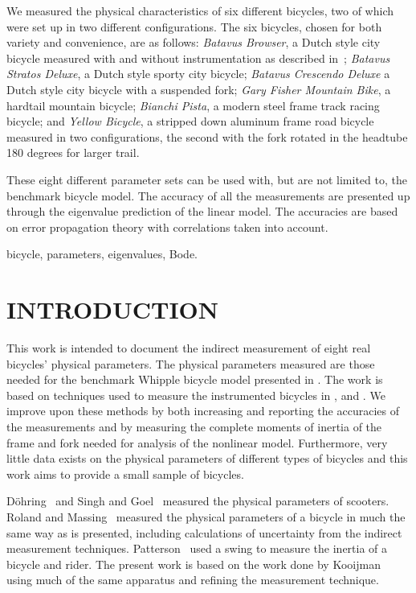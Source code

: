 \documentclass{bmd2010p}
\begin{document}
We measured the physical characteristics of six different bicycles, two of
which were set up in two different configurations. The six bicycles, chosen for
both variety and convenience, are as follows:
\emph{Batavus Browser}, a Dutch style city bicycle measured with and without
instrumentation as described in~\cite{Kooijman2009a}; \emph{Batavus Stratos
Deluxe}, a Dutch style sporty city bicycle; \emph{Batavus Crescendo Deluxe} a
Dutch style city bicycle with a suspended fork; \emph{Gary Fisher Mountain
Bike}, a hardtail mountain bicycle; \emph{Bianchi Pista}, a modern steel frame
track racing bicycle; and \emph{Yellow Bicycle}, a stripped down aluminum frame
road bicycle measured in two configurations, the second with the fork rotated
in the headtube 180 degrees for larger trail.

These eight different parameter sets can be used with, but are not
limited to, the benchmark bicycle model. The accuracy of all the measurements
are presented up through the eigenvalue prediction of the linear model. The
accuracies are based on error propagation theory with correlations taken into
account.

\begin{keywords}
bicycle,
parameters,
eigenvalues,
Bode.
\end{keywords}

\section{INTRODUCTION}
This work is intended to document the indirect measurement of eight real
bicycles' physical parameters. The physical parameters measured are those
needed for the benchmark Whipple bicycle model presented in
\cite{Meijaard2007}. The work is based on techniques used to measure the
instrumented bicycles in \cite{Kooijman2006}, \cite{Kooijman2008} and
\cite{Moore2009a}. We improve upon these methods by both increasing and reporting
the accuracies of the measurements and by measuring the complete moments of
inertia of the frame and fork needed for analysis of the nonlinear model.
Furthermore, very little data exists on the physical parameters of different
types of bicycles and this work aims to provide a small sample of bicycles.

D\"{o}hring~\cite{Dohring1953} and Singh and Goel~\cite{Singh1971} measured the
physical parameters of scooters.
Roland and Massing~\cite{Roland1971} measured the physical parameters of a
bicycle in much the
same way as is presented, including calculations of uncertainty from the indirect
measurement techniques. Patterson~\cite{Patterson2004} used a swing to measure the
inertia of a bicycle and rider. The present work is based on the work
done by Kooijman~\cite{Kooijman2006} using much of the same apparatus and
refining the measurement technique.
\end{document}
